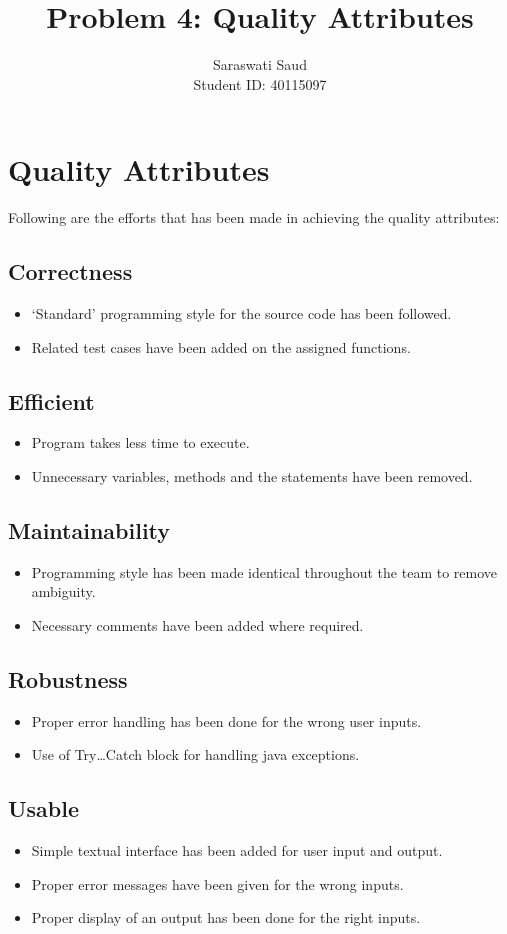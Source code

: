 \documentclass[a4paper,12pt]{article}
\title{Problem 4: Quality Attributes}
\author{Saraswati Saud \\
Student ID: 40115097}
\date{}
\begin{document}
\maketitle
\section{Quality Attributes}
    Following are the efforts that has been made in achieving the quality attributes:
    \subsection{Correctness}
    \begin{itemize}
        \item ‘Standard’ programming style for the source code has been followed.
        \item Related test cases have been added on the assigned functions.
    \end{itemize}
    
    \subsection{Efficient}
    \begin{itemize}
        \item Program takes less time to execute.
        \item Unnecessary variables, methods and the statements have been removed.
    \end{itemize}
    
    \subsection{Maintainability}
    \begin{itemize}
        \item Programming style has been made identical throughout the team to remove ambiguity.
        \item Necessary comments have been added where required.
    \end{itemize}
    
    \subsection{Robustness}
    \begin{itemize}
        \item Proper error handling has been done for the wrong user inputs.
        \item Use of Try…Catch block for handling java exceptions.
    \end{itemize}
    
    \subsection{Usable}
    \begin{itemize}
        \item Simple textual interface has been added for user input and output.
        \item Proper error messages have been given for the wrong inputs.
        \item Proper display of an output has been done for the right inputs.
    \end{itemize}
    
\end{document}
